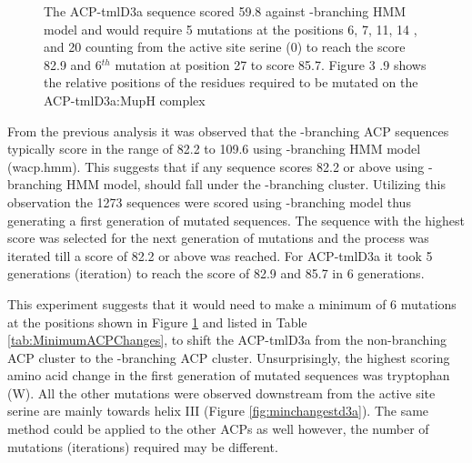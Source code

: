 		\setlength\fboxsep{5pt}
		\setlength\fboxrule{1.5pt}
		\begin{figure}[]
		\centering
		\caption[The number of mutations required to reach the score of 82.2 or above when scored with \bet-branching HMM model.]{The ACP-tmlD3a sequence scored 59.8 against \bet-branching HMM model and would require 5 mutations at the positions 6, 7, 11, 14 , and 20 counting from the active site serine (0) to reach the score 82.9 and 6$^{th}$ mutation at position 27 to score 85.7. Figure  3 .9 shows the relative positions of the residues required to be mutated on the ACP-tmlD3a:MupH complex}
		\label{fig:minchanges}
		\end{figure}
					
		From the previous analysis it was observed that the \bet-branching ACP sequences typically score in the range of 82.2 to 109.6 using \bet-branching HMM model (wacp.hmm). This suggests that if any sequence scores 82.2 or above using \bet-branching HMM model, should fall under the \bet-branching cluster. Utilizing this observation the 1273 sequences were scored using \bet-branching model %
		thus generating a first generation of mutated sequences. The sequence with the highest score was selected for the next generation of mutations and the process was iterated till a score of 82.2 or above was reached. For ACP-tmlD3a it took 5 generations (iteration) to reach the score of 82.9 and 85.7 in 6 generations. 
				
		This experiment suggests that it would need to make a minimum of 6 mutations at the positions shown in Figure \ref{fig:minchanges} and listed in Table \ref{tab:MinimumACPChanges}, to shift the ACP-tmlD3a from the non-branching ACP cluster to the \bet-branching ACP cluster. Unsurprisingly, the highest scoring amino acid change in the first generation of mutated sequences was tryptophan (W). All the other mutations were observed downstream from the active site serine are mainly towards helix III (Figure \ref{fig:minchangestd3a}). The same method could be applied to the other ACPs as well however, the number of mutations (iterations) required may be different.
				
